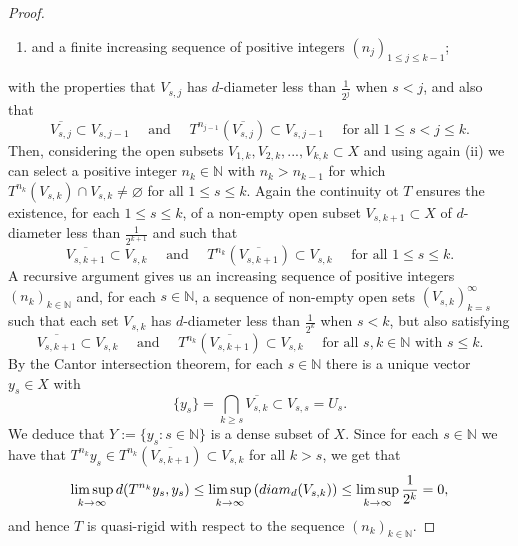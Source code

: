 \documentclass[10pt,a4paper]{amsart}
\newcommand{\NN}{\mathbb{N}}
\newcommand{\cl}{\overline}
\newcommand{\diam}{\textup{diam}}
\begin{document}
\begin{proof}
\begin{enumerate}[--]
		\item and a finite increasing sequence of positive integers $(n_j)_{1\leq j\leq k-1}$;
	\end{enumerate}
	with the properties that $V_{s,j}$ has $d$-diameter less than $\frac{1}{2^j}$ when $s<j$, and also that
	\[
	\cl{V_{s,j}} \subset V_{s,j-1} \quad \text{ and } \quad T^{n_{j-1}}\left(\cl{V_{s,j}}\right) \subset V_{s,j-1} \quad \text{ for all } 1\leq s < j \leq k.
	\]
	Then, considering the open subsets $V_{1,k}, V_{2,k}, ..., V_{k,k} \subset X$ and using again (ii) we can select a positive integer $n_k \in \NN$ with $n_k>n_{k-1}$ for which $T^{n_k}(V_{s,k}) \cap V_{s,k} \neq \varnothing$ for all $1\leq s\leq k$. Again the continuity ot $T$ ensures the existence, for each $1\leq s\leq k$, of a non-empty open subset $V_{s,k+1} \subset X$ of $d$-diameter less than $\frac{1}{2^{k+1}}$ and such that
	\[
	\cl{V_{s,k+1}} \subset V_{s,k} \quad \text{ and } \quad T^{n_{k}}\left(\cl{V_{s,k+1}}\right) \subset V_{s,k} \quad \text{ for all } 1\leq s\leq k.
	\]
	A recursive argument gives us an increasing sequence of positive integers $(n_k)_{k\in\NN}$ and, for each $s \in \NN$, a sequence of non-empty open sets $(V_{s,k})_{k=s}^{\infty}$ such that each set $V_{s,k}$ has $d$-diameter less than $\frac{1}{2^k}$ when $s<k$, but also satisfying
	\[
	\cl{V_{s,k+1}}\subset V_{s,k} \quad \text{ and } \quad  T^{n_k}\left(\cl{V_{s,k+1}}\right)\subset V_{s,k} \quad \text{ for all } s,k \in \NN \text{ with } s\leq k.
	\]
	By the Cantor intersection theorem, for each $s\in\NN$ there is a unique vector $y_s\in X$ with
	\[
	\{y_s\} = \bigcap_{k\geq s} \cl{V_{s,k}} \subset V_{s,s} = U_s.
	\]
	We deduce that $Y:=\{ y_s: s \in \NN \}$ is a dense subset of $X$. Since for each $s \in \NN$ we have that $T^{n_k}y_s \in T^{n_k}\left(\cl{V_{s,k+1}}\right) \subset V_{s,k}$ for all $k > s$, we get that
	\[
	\limsup_{k\to\infty} d(T^{n_k}y_s,y_s) \leq \limsup_{k\to\infty} \left(\diam_d(V_{s,k})\right) \leq \limsup_{k\to\infty} \frac{1}{2^k} = 0,
	\]
	and hence $T$ is quasi-rigid with respect to the sequence $(n_k)_{k\in\NN}$.
\end{proof}
\end{document}
